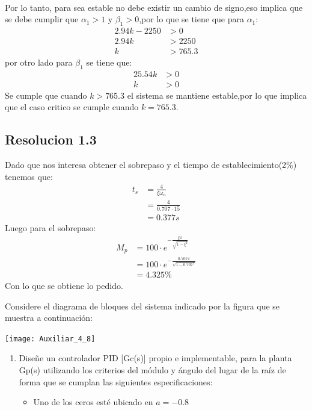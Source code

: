 \documentclass[
  11pt,
  letterpaper,
   addpoints,
   answers
  ]{exam}
\begin{document}
\begin{questions}
\begin{solution}
\begin{align}
\end{align}
Por lo tanto, para sea estable no debe existir un cambio de signo,eso implica que se debe cumplir que $\alpha_{1}>1$ y $\beta_{1}>0$,por lo que se tiene que para $\alpha_{1}$:
\begin{align}
    2.94k - 2250 &> 0\\
    2.94k &> 2250\\
    k &> 765.3
\end{align}
por otro lado para $\beta_{1}$ se tiene que:
\begin{align}
    25.54k &> 0\\
    k &> 0
\end{align}
Se cumple que cuando $k>765.3$ el sistema se mantiene estable,por lo que implica que el caso critico se cumple cuando $k=765.3$.
\subsection*{Resolucion 1.3}
Dado que nos interesa obtener el sobrepaso y el tiempo de establecimiento(2\%) tenemos que:
\begin{align}
    t_{s} &= \frac{4}{\xi \omega_{n}}\\
          &= \frac{4}{0.707\cdot 15}\\
          &= 0.377 s
\end{align}
Luego para el sobrepaso:
\begin{align}
    M_{p} &= 100 \cdot e^{-\frac{\xi \pi}{\sqrt{1-\xi^{2}}}}\\
          &= 100 \cdot e^{-\frac{0.707 \pi}{\sqrt{1-0.707^{2}}} }\\
          &= 4.325 \%
\end{align}
Con lo que se obtiene lo pedido.
\end{solution}
    \question Considere el diagrama de bloques del sistema indicado por la figura que se muestra a continuación:
    \begin{center}
        \texttt{[image: Auxiliar\_4\_8]}
    \end{center}
    \begin{enumerate}
    \item Diseñe un controlador PID [Gc(s)] propio e implementable, para la planta Gp(s) utilizando los criterios del módulo y ángulo del lugar de la raíz de forma que se cumplan las siguientes especificaciones:
    \begin{itemize}
        \item Uno de los ceros esté ubicado en $a=-0.8$

\end{itemize}
\end{enumerate}
\end{questions}
\end{document}
